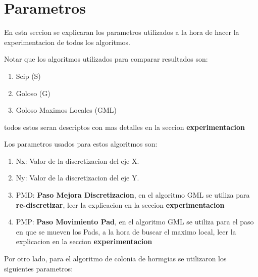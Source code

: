 \newpage
\section{Parametros}

En esta seccion se explicaran los parametros utilizados a la hora de hacer la experimentacion de todos los algoritmos. 

Notar que los algoritmos utilizados para comparar resultados son:

\begin{enumerate}
\item Scip (S)
\item Goloso (G)
\item Goloso Maximos Locales (GML)
\end{enumerate}

todos estos seran descriptos con mas detalles en la seccion \textbf{experimentacion}

Los parametros usados para estos algoritmos son:


\begin{enumerate}
\item Nx: Valor de la discretizacion del eje X.
\item Ny: Valor de la discretizacion del eje Y.
\item PMD: \textbf{Paso Mejora Discretizacion}, en el algoritmo GML se utiliza para \textbf{re-discretizar}, leer la explicacion en la seccion \textbf{experimentacion}
\item PMP: \textbf{Paso Movimiento Pad}, en el algoritmo GML se utiliza para el paso en que se mueven los Pads, a la hora de buscar el maximo local, leer la explicacion en la seccion \textbf{experimentacion}
\end{enumerate}

Por otro lado, para el algoritmo de colonia de hormgias se utilizaron los siguientes parametros:
							
